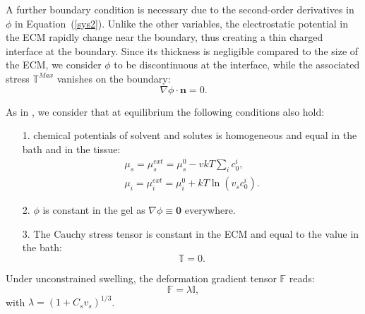 \documentclass[runningheads]{llncs}
\newcommand{\F}{\ensuremath{\mathbb{F}}}
\begin{document}
A further boundary condition is necessary due to the second-order derivatives in $\phi$ in Equation~(\ref{sys2}). Unlike the other variables, the electrostatic potential in the ECM rapidly change near the boundary, thus creating a thin charged interface at the boundary. Since its thickness is negligible compared to the size of the ECM, we consider $\phi$ to be discontinuous at the interface, while the associated stress $\mathbb{T}^{Max}$ vanishes on the boundary:
\begin{equation}
\nabla \phi \cdot \mathbf{n}= 0.
\end{equation}

As in \cite{DROZDOVph}, we consider that at equilibrium the following conditions also hold:
\begin{itemize}
	\item[1.] chemical potentials of solvent and solutes is homogeneous and equal in the bath and in the tissue:
	\begin{eqnarray}
	\mu_s=\mu^{ext}_s = \mu^0_s - vkT \sum_i c^i_0 ,\\\label{free1}
	\mu_i=\mu^{ext}_i = \mu^0_i +kT\ln(v_sc^i_0).\label{freeend}
	\end{eqnarray} 
	\item[2.] $\phi$ is constant in the gel as $\nabla \phi \equiv \mathbf{0}$ everywhere.
	\item[3.] The Cauchy stress tensor is constant in the ECM and equal to the value in the bath:
	\begin{equation}
	\mathbb{T}=0.\label{free2}
	\end{equation} 
\end{itemize}

Under unconstrained swelling, the deformation gradient tensor $\F$ reads:
\begin{equation}
\F= \lambda \mathbb{I},\label{deffree}                                                                
\end{equation}
with $\lambda=(1+C_s v_s)^{1/3}$. 
\end{document}
